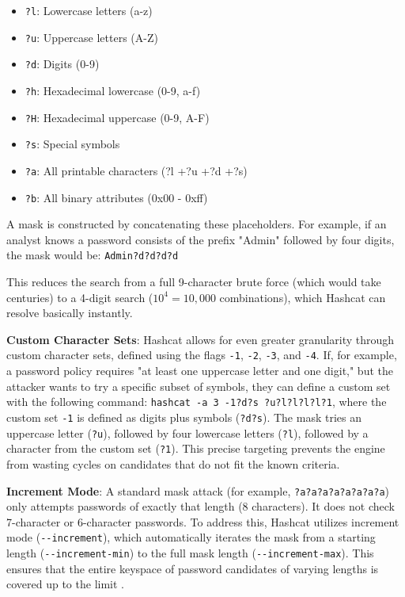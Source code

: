 \begin{itemize}
    \item \verb|?l|: Lowercase letters (a-z)

    \item \verb|?u|: Uppercase letters (A-Z)

    \item \verb|?d|: Digits (0-9)

    \item \verb|?h|: Hexadecimal lowercase (0-9, a-f)

    \item \verb|?H|: Hexadecimal uppercase (0-9, A-F)

    \item \verb|?s|: Special symbols

    \item \verb|?a|: All printable characters (?l +?u +?d +?s)

    \item \verb|?b|: All binary attributes (0x00 - 0xff)
\end{itemize}

A mask is constructed by concatenating these placeholders. For example, if an analyst knows a password consists of the prefix "Admin" followed by four digits, the mask would be: \verb|Admin?d?d?d?d|

This reduces the search from a full 9-character brute force (which would take centuries) to a 4-digit search ($10^4 = 10,000$ combinations), which Hashcat can resolve basically instantly.

\textbf{Custom Character Sets}: Hashcat allows for even greater granularity through custom character sets, defined using the flags \verb|-1|, \verb|-2|, \verb|-3|, and \verb|-4|. If, for example, a password policy requires "at least one uppercase letter and one digit," but the attacker wants to try a specific subset of symbols, they can define a custom set with the following command: \verb|hashcat -a 3 -1?d?s ?u?l?l?l?l?1|, where the custom set \verb|-1| is defined as digits plus symbols (\verb|?d?s|). The mask tries an uppercase letter (\verb|?u|), followed by four lowercase letters (\verb|?l|), followed by a character from the custom set (\verb|?1|). This precise targeting prevents the engine from wasting cycles on candidates that do not fit the known criteria.

\textbf{Increment Mode}: A standard mask attack (for example, \verb|?a?a?a?a?a?a?a?a|) only attempts passwords of exactly that length (8 characters). It does not check 7-character or 6-character passwords. To address this, Hashcat utilizes increment mode (\verb|--increment|), which automatically iterates the mask from a starting length (\verb|--increment-min|) to the full mask length (\verb|--increment-max|). This ensures that the entire keyspace of password candidates of varying lengths is covered up to the limit .


